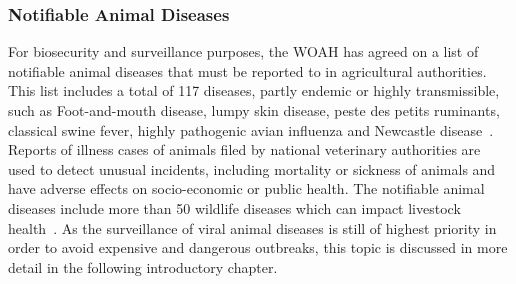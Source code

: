 \subsubsection*{Notifiable Animal Diseases}
For biosecurity and surveillance purposes, the \ac{WOAH} has agreed on a list of notifiable animal diseases that must be reported to in agricultural authorities. This list includes a total of 117 diseases, partly endemic or highly transmissible, such as Foot-and-mouth disease, lumpy skin disease, peste des petits ruminants, classical swine fever, highly pathogenic avian influenza and Newcastle disease~\cite{woah2023list}.\\
Reports of illness cases of animals filed by national veterinary authorities are used to detect unusual incidents, including mortality or sickness of animals and have adverse effects on socio-economic or public health. The notifiable animal diseases include more than 50 wildlife diseases which can impact livestock health~\cite{woah2023list}. As the surveillance of viral animal diseases is still of highest priority in order to avoid expensive and dangerous outbreaks, this topic is discussed in more detail in the following introductory chapter.

